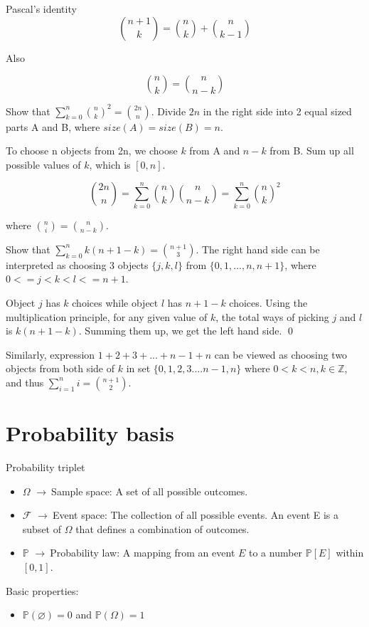 \documentclass[11pt,a4paper,fleqn]{article}
\numberwithin{equation}{section}
\newcommand{\g}{$\rightarrow\ $}
\begin{document}
\begin{fact}{Pascal’s identity}{}
    \[
    \binom{n+1}{k} = \binom{n}{k} + \binom{n}{k-1}
    \]
\end{fact}

Also

\[
{n \choose k} = {n \choose n-k}
\]

\begin{exec}
    Show that $\sum_{k=0}^{n}{n \choose k}^2 = {2n \choose n}.$
    \tcblower
    Divide $2n$ in the right side into 2 equal sized parts A and B, where $size(A)=size(B)=n$.
    
    To choose n objects from 2n, we choose $k$ from A and $n-k$ from B.
    Sum up all possible values of $k$, which is $[0,n]$.
    
    \[
    {2n \choose n} = \sum_{k=0}^{n}{n \choose k}{n \choose n-k} = \sum_{k=0}^{n}{n \choose k}^2
    \]
    
    where ${n \choose i} = {n \choose n-k}$.
\end{exec}

\begin{exec}
    Show that $\sum_{k=0}^{n} k(n+1-k)={n+1 \choose 3}$.
    \tcblower
    The right hand side can be interpreted as choosing 3 objects $\{j,k,l\}$ from $\{0,1,...,n,n+1\}$, where $0<=j<k<l<=n+1$.
    
    Object $j$ has $k$ choices while object $l$ has $n+1-k$ choices. Using the multiplication principle, for any given value of $k$, the total ways of picking $j$ and $l$ is $k(n+1-k)$. Summing them up, we get the left hand side.
    \qed
    
    Similarly, expression $1+2+3+...+n-1+n$ can be viewed as choosing two objects from both side of $k$ in set $\{0,1,2,3....n-1,n\}$ where $0<k<n, k \in \mathbb{Z}$, and thus $\sum_{i=1}^{n}i={n+1 \choose 2}$.
\end{exec}

\section{Probability basis}

\begin{fact}{Probability triplet}{}
    \begin{itemize}
        \item $\Omega$ \g Sample space: A set of all possible outcomes.
        \item $\mathcal{F}$ \g Event space: The collection of all  possible events. An event E is a subset of $\Omega$ that defines a combination of outcomes.
        \item $\mathbb{P}$ \g Probability law: A mapping from an event $E$ to a number $\mathbb{P}[E]$ within $[0,1]$.
    \end{itemize}
    Basic properties:
    \begin{itemize}
        \item $\mathbb{P}(\varnothing)=0$ and $\mathbb{P}(\Omega)=1$
    \end{itemize}
\end{fact}
\end{document}
